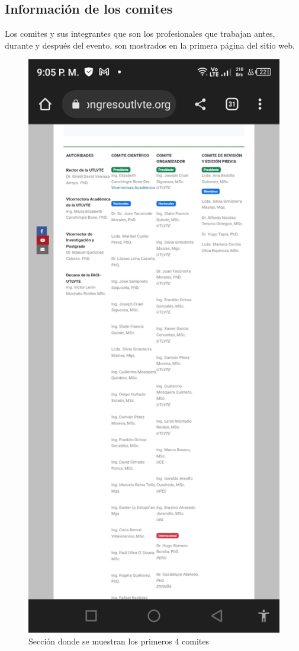 \documentclass[a4paper,14px]{article}
\begin{document}
\newpage
\subsection{Información de los comites }

Los comites y sus integrantes que son los profesionales que trabajan antes, durante y después del evento, son mostrados en la primera página del sitio web. \\




\begin{minipage}[H]{0.45\linewidth}
  \begin{figure}[H]
    \centering
    \includegraphics[scale=0.3]{comite1.jpg}
    \caption{Sección donde se muestran los primeros 4 comites}
    \label{fig:comite1}
  \end{figure}
\end{minipage}
\end{document}
